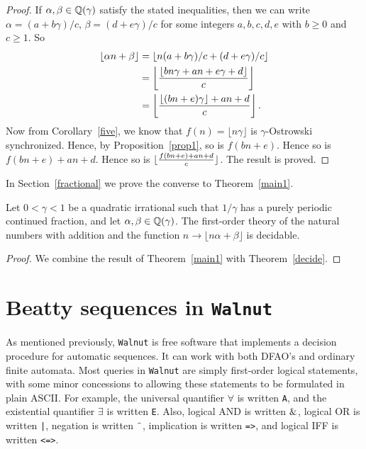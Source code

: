 \documentclass[12pt,reqno]{article}
\begin{document}
\begin{proof}
If $\alpha, \beta \in \mathbb{Q}(\gamma)$ satisfy the stated
inequalities, then we can write
$\alpha= (a+ b\gamma)/c$,
$\beta = (d + e\gamma)/c$
for some integers $a, b, c, d, e$ with $b\geq 0$ and $c \geq 1$.
So 
\begin{align*}
\lfloor \alpha n + \beta\rfloor &= \lfloor n (a+b\gamma)/c + (d + e\gamma)/c \rfloor  \\
&= \left\lfloor {{\lfloor bn\gamma  + an + e\gamma + d \rfloor} \over c } \right\rfloor \\
&= \left\lfloor {{ \lfloor (bn+e)\gamma \rfloor  + an+d } \over c} \right\rfloor.
\end{align*}
Now from Corollary~\ref{five}, we know that
$f(n) = \lfloor n \gamma \rfloor$ is $\gamma$-Ostrowski
synchronized.   Hence, by Proposition~\ref{prop1}, so is $f(bn+e)$.   Hence so is
$f(bn+e) + an+d$.   Hence so is
$\lfloor {{f(bn+e)+ an+d}\over c} \rfloor$.   The result is proved.
\end{proof}

\begin{remark} In Section~\ref{fractional} we prove the
converse to Theorem~\ref{main1}.
\end{remark}

\begin{corollary}
Let $0 < \gamma < 1$ be a quadratic irrational such that $1/\gamma$ has a purely
periodic continued fraction, and let $\alpha, \beta \in \mathbb{Q}(\gamma)$.    The first-order theory of the natural numbers with addition and the
function $n \rightarrow \lfloor n\alpha+ \beta \rfloor$ is decidable.
\label{main1a}
\end{corollary}

\begin{proof}
We combine the result of Theorem~\ref{main1} with Theorem~\ref{decide}.
\end{proof}


\section{Beatty sequences in {\tt Walnut}}

As mentioned previously, {\tt Walnut} is free software that implements a
decision procedure for automatic sequences.  It can work with both
DFAO's and ordinary finite automata.  Most queries in {\tt Walnut} are 
simply first-order logical statements, with some minor concessions
to allowing these statements to be formulated in plain ASCII.  For example,
the universal quantifier $\forall$ is written {\tt A}, and the
existential quantifier $\exists$ is written {\tt E}.  Also,
logical AND is written ${\tt \&}$, logical OR is written {\tt |},
negation is written ${\tt\char'176}$, implication is written {\tt =>},
and logical IFF is written {\tt <=>}.
\end{document}
